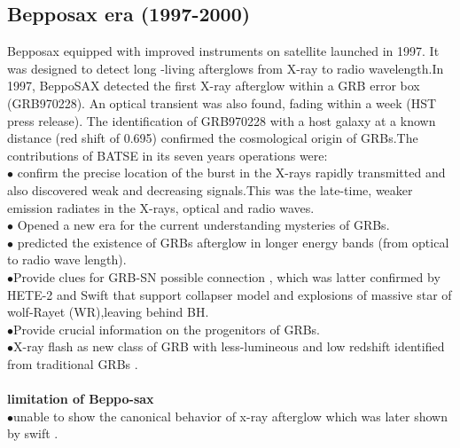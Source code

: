 \subsection{Bepposax era (1997-2000)}
Bepposax equipped with improved instruments on satellite launched in 1997. It was designed to detect long -living afterglows from X-ray to  radio wavelength.In 1997, BeppoSAX detected the first X-ray afterglow within a GRB error box (GRB970228). An optical transient was also found, fading within a week (HST press release). The identification of GRB970228 with a host galaxy at a known distance (red shift of 0.695) confirmed the cosmological origin of GRBs.The contributions of BATSE in its seven years operations were:\\
$\bullet$ confirm the precise location of the burst in the X-rays rapidly transmitted  and also discovered weak and decreasing signals.This was the late-time, weaker emission radiates in the X-rays, optical and radio waves. \\
$\bullet$ Opened a new era for the current understanding  mysteries of GRBs.\\
$\bullet$ predicted the existence of GRBs afterglow in longer energy bands (from optical to radio wave length).\\
$\bullet$Provide clues for GRB-SN possible connection , which was latter confirmed by
HETE-2 and Swift that support collapser model and explosions of massive star
of wolf-Rayet (WR),leaving behind BH.\\
$\bullet$Provide crucial information on the progenitors of GRBs.\\
$\bullet$X-ray flash as new class of GRB with less-lumineous and low redshift identified from traditional GRBs \citep{4} \citep{7}.\\\\
\textbf{limitation of Beppo-sax}\\
$\bullet$unable to show the canonical behavior of x-ray afterglow which was later shown by swift \citep{5}.\\\\
